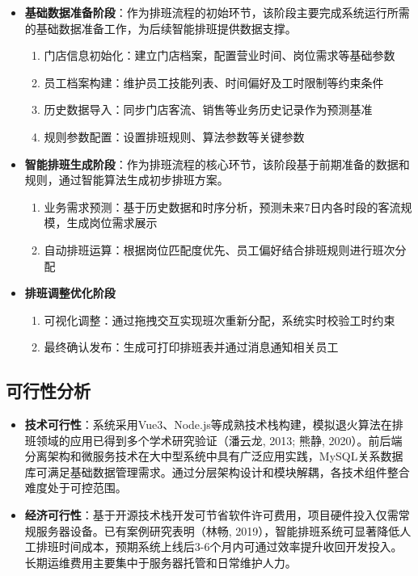 \documentclass{ctexart}
\begin{document}
\begin{itemize}
    \item \textbf{基础数据准备阶段}：作为排班流程的初始环节，该阶段主要完成系统运行所需的基础数据准备工作，为后续智能排班提供数据支撑。
    \begin{enumerate}
        \item 门店信息初始化：建立门店档案，配置营业时间、岗位需求等基础参数
        \item 员工档案构建：维护员工技能列表、时间偏好及工时限制等约束条件
        \item 历史数据导入：同步门店客流、销售等业务历史记录作为预测基准
        \item 规则参数配置：设置排班规则、算法参数等关键参数
    \end{enumerate}

    \item \textbf{智能排班生成阶段}：作为排班流程的核心环节，该阶段基于前期准备的数据和规则，通过智能算法生成初步排班方案。
        \begin{enumerate}
            \item 业务需求预测：基于历史数据和时序分析，预测未来7日内各时段的客流规模，生成岗位需求展示
            \item 自动排班运算：根据岗位匹配度优先、员工偏好结合排班规则进行班次分配
        \end{enumerate}

    \item \textbf{排班调整优化阶段}
    \begin{enumerate}
        \item 可视化调整：通过拖拽交互实现班次重新分配，系统实时校验工时约束
        \item 最终确认发布：生成可打印排班表并通过消息通知相关员工
    \end{enumerate}
\end{itemize}
\subsection{可行性分析}
\begin{itemize}
    \item \textbf{技术可行性}：系统采用Vue3、Node.js等成熟技术栈构建，模拟退火算法在排班领域的应用已得到多个学术研究验证（潘云龙, 2013; 熊静, 2020）。前后端分离架构和微服务技术在大中型系统中具有广泛应用实践，MySQL关系数据库可满足基础数据管理需求。通过分层架构设计和模块解耦，各技术组件整合难度处于可控范围。

    \item \textbf{经济可行性}：基于开源技术栈开发可节省软件许可费用，项目硬件投入仅需常规服务器设备。已有案例研究表明（林畅, 2019），智能排班系统可显著降低人工排班时间成本，预期系统上线后3-6个月内可通过效率提升收回开发投入。长期运维费用主要集中于服务器托管和日常维护人力。
\end{itemize}
\end{document}
